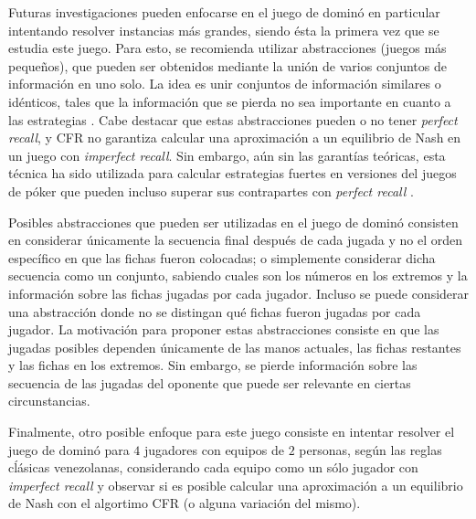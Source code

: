 Futuras investigaciones pueden enfocarse en el juego de dominó en particular intentando resolver instancias más grandes, siendo ésta la primera vez que se estudia este juego. Para esto, se recomienda utilizar abstracciones (juegos más pequeños), que pueden ser obtenidos mediante la unión de varios conjuntos de información en uno solo. La idea es unir conjuntos de información similares o idénticos, tales que la información que se pierda no sea importante en cuanto a las estrategias \cite[pp.~71-72]{bib:thesis-marc-lanctot}. Cabe destacar que estas abstracciones pueden o no tener \textit{perfect recall}, y CFR no garantiza calcular una aproximación a un equilibrio de Nash en un juego con \textit{imperfect recall}. Sin embargo, aún sin las garantías teóricas, esta técnica ha sido utilizada para calcular estrategias fuertes en versiones del juegos de póker que pueden incluso superar sus contrapartes con \textit{perfect recall} \cite{bib:imperfect-recall}.

Posibles abstracciones que pueden ser utilizadas en el juego de dominó consisten en considerar únicamente la secuencia final después de cada jugada y no el orden específico en que las fichas fueron colocadas; o simplemente considerar dicha secuencia como un conjunto, sabiendo cuales son los números en los extremos y la información sobre las fichas jugadas por cada jugador. Incluso se puede considerar una abstracción donde no se distingan qué fichas fueron jugadas por cada jugador. La motivación para proponer estas abstracciones consiste en que las jugadas posibles dependen únicamente de las manos actuales, las fichas restantes y las fichas en los extremos. Sin embargo, se pierde información sobre las secuencia de las jugadas del oponente que puede ser relevante en ciertas circunstancias.

Finalmente, otro posible enfoque para este juego consiste en intentar resolver el juego de dominó para $4$ jugadores con equipos de $2$ personas, según las reglas cĺásicas venezolanas, considerando cada equipo como un sólo jugador con \textit{imperfect recall} y observar si es posible calcular una aproximación a un equilibrio de Nash con el algortimo CFR (o alguna variación del mismo).
